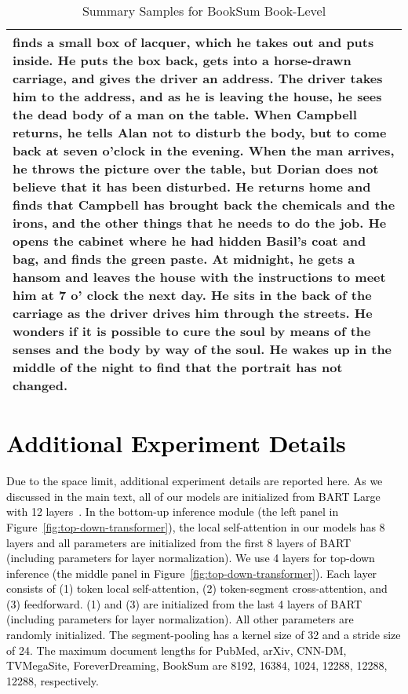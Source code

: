 \documentclass{article} \usepackage{iclr2022_conference,times}
\begin{document}
\begin{table}[!htbp]
\begin{tabular}{p{\linewidth}}
finds a small box of lacquer, which he takes out and puts inside. He puts the box back, gets into a horse-drawn carriage, and gives the driver an address. The driver takes him to the address, and as he is leaving the house, he sees the dead body of a man on the table. When Campbell returns, he tells Alan not to disturb the body, but to come back at seven o'clock in the evening. When the man arrives, he throws the picture over the table, but Dorian does not believe that it has been disturbed. He returns home and finds that Campbell has brought back the chemicals and the irons, and the other things that he needs to do the job. He opens the cabinet where he had hidden Basil's coat and bag, and finds the green paste. At midnight, he gets a hansom and leaves the house with the instructions to meet him at 7 o' clock the next day. He sits in the back of the carriage as the driver drives him through the streets. He wonders if it is possible to cure the soul by means of the senses and the body by way of the soul. He wakes up in the middle of the night to find that the portrait has not changed.
    \\
    \bottomrule
    \end{tabular}
    \caption{
    Summary Samples for BookSum Book-Level
    }
\end{table}


\clearpage
\section{\textcolor{black}{Additional Experiment Details}}
\textcolor{black}{
Due to the space limit, additional experiment details are reported here. As we discussed in the main text, all of our models are initialized from BART Large with 12 layers~\citep{lewis-etal-2020-bart}. In the bottom-up inference module (the left panel in Figure~\ref{fig:top-down-transformer}), the local self-attention in our models has 8 layers and all parameters are initialized from the first 8 layers of BART (including parameters for layer normalization). We use 4 layers for top-down inference (the middle panel in Figure~\ref{fig:top-down-transformer}). Each layer consists of (1) token local self-attention, (2) token-segment cross-attention, and (3) feedforward. (1) and (3) are initialized from the last 4 layers of BART (including parameters for layer normalization). All other parameters are randomly initialized. The segment-pooling has a kernel size of 32 and a stride size of 24. The maximum document lengths for PubMed, arXiv, CNN-DM, TVMegaSite, ForeverDreaming, BookSum are 8192, 16384, 1024, 12288, 12288, 12288, respectively.
}
\end{document}
